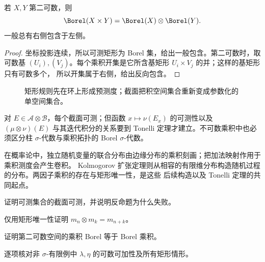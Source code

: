 \begin{proposition}\label{proposition:2-3-2-4}
若 $X,Y$ 第二可数，则
\[
 \Borel(X\times Y)=\Borel(X)\otimes\Borel(Y).
\]
一般总有右侧包含于左侧。
\end{proposition}

\begin{proof}
坐标投影连续，所以可测矩形为 Borel 集，给出一般包含。第二可数时，取可数基
$(U_i),(V_j)$。每个乘积开集是它所含基矩形 $U_i\times V_j$ 的并；这样的基矩形只有可数多个，
所以开集属于右侧，给出反向包含。
\end{proof}

\begin{figure}[htbp]
\centering
{}
\caption{矩形规则先在环上形成预测度；截面把积空间集合重新变成参数化的单空间集合。}
\label{fig:product-sections-extension}
\end{figure}

\begin{remark}
对 $E\in\mathcal A\otimes\mathcal B$，每个截面可测；但函数
$x\mapsto\nu(E_x)$ 的可测性以及
$(\mu\otimes\nu)(E)$ 与其迭代积分的关系要到 Tonelli 定理才建立。不可数乘积中也必须区分柱
$\sigma$-代数与乘积拓扑的 Borel $\sigma$-代数。
\end{remark}

在概率论中，独立随机变量的联合分布由边缘分布的乘积刻画；把加法映射作用于乘积测度会产生卷积。
Kolmogorov 扩张定理则从相容的有限维分布构造随机过程的分布。两因子乘积的存在与矩形唯一性，是这些
后续构造以及 Tonelli 定理的共同起点。

\begin{exercise}
证明可测集合的截面可测，并说明反命题为什么失败。
\end{exercise}
\begin{exercise}
仅用矩形唯一性证明 $m_n\otimes m_k=m_{n+k}$。
\end{exercise}
\begin{exercise}
证明第二可数空间的乘积 Borel 等于 Borel 乘积。
\end{exercise}
\begin{exercise}
逐项核对非 $\sigma$-有限例中 $\lambda,\eta$ 的可数可加性及所有矩形情形。
\end{exercise}

